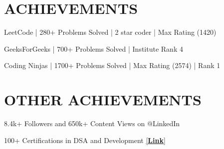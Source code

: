 \begin{minipage}[t]{0.66\textwidth}
\section{ACHIEVEMENTS} 
\vspace{\topsep} %
\begin{tightemize}
\item LeetCode | 280+ Problems Solved | 2 star coder | Max Rating (1420) 
\item GeeksForGeeks | 700+ Problems Solved | Institute Rank 4
\item Coding Ninjas | 1700+ Problems Solved | Max Rating (2574) | Rank 1

\end{tightemize}
\sectionsep

\section{OTHER ACHIEVEMENTS} 
\vspace{\topsep} %
\begin{tightemize}
\item 8.4k+ Followers and 650k+ Content Views on @LinkedIn \\
\item 100+ Certifications in DSA and Development \href{https://www.linkedin.com/in/iamrudhresh/details/certifications/}{[\textbf{Link}]\bf} \\

\end{tightemize}
\sectionsep

\end{minipage} 
  \documentclass[]{article}




